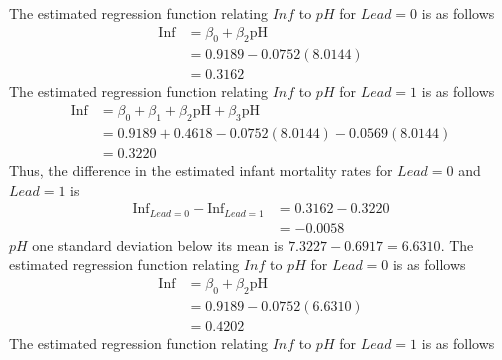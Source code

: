 \documentclass{uofa-eng-assignment}
\begin{document}
\begin{enumerate}
\begin{enumerate}
\begin{enumerate}
                          The estimated regression function relating $Inf$ to $pH$ for $Lead = 0$ is as
                          follows
                          \begin{align*}
                              \text{Inf} & = \beta_0 + \beta_2\text{pH} \\
                                         & = 0.9189 - 0.0752(8.0144)    \\
                                         & = 0.3162
                          \end{align*}
                          The estimated regression function relating $Inf$ to $pH$ for $Lead = 1$ is
                          as follows
                          \begin{align*}
                              \text{Inf} & = \beta_0 + \beta_1 + \beta_2\text{pH} + \beta_3\text{pH} \\
                                         & = 0.9189 + 0.4618 - 0.0752(8.0144) - 0.0569(8.0144)       \\
                                         & = 0.3220
                          \end{align*}
                          Thus, the difference in the estimated infant mortality rates for $Lead = 0$ and $Lead = 1$ is
                          \begin{align*}
                              \text{Inf}_{Lead = 0} - \text{Inf}_{Lead = 1} & = 0.3162 - 0.3220 \\
                                                                            & = -0.0058
                          \end{align*}
                          $pH$ one standard deviation below its mean is $7.3227 - 0.6917 = 6.6310$.
                          The estimated regression function relating $Inf$ to $pH$ for $Lead = 0$ is as
                          follows
                          \begin{align*}
                              \text{Inf} & = \beta_0 + \beta_2\text{pH} \\
                                         & = 0.9189 - 0.0752(6.6310)    \\
                                         & = 0.4202
                          \end{align*}
                          The estimated regression function relating $Inf$ to $pH$ for $Lead = 1$ is
                          as follows
                          \begin{align*}

\end{align*}
\end{enumerate}
\end{enumerate}
\end{enumerate}
\end{document}
